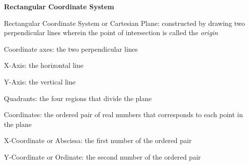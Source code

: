 \begin{center}
\textbf{Rectangular Coordinate System 
}
\end{center}

\vspce

Rectangular Coordinate System or 
 Cartesian Plane: constructed by drawing two perpendicular lines wherein the point of intersection is called the \emph{origin  }

\vspce 

Coordinate axes: the two perpendicular lines

\vspce 

X-Axis: the horizontal line

\vspce 

Y-Axis: the vertical line

\vspce 

Quadrants: the four regions that divide the plane

\vspce 

Coordinates: the ordered pair of real numbers that corresponds to each point in the plane

\vspce

X-Coordinate or Abscissa: the first number of the ordered pair

\vspce 

Y-Coordinate or Ordinate: the second  number of the ordered pair

